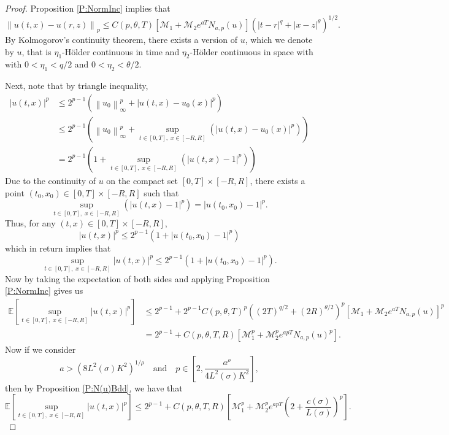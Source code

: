 \documentclass[a4paper,11pt]{article}
\numberwithin{equation}{section}
\theoremstyle{plain}
\theoremstyle{definition}
\newcommand{\Norm}[1]{\left\|  #1   \right\|}
\numberwithin{NQ}{section}
\numberwithin{LQ}{section}
\numberwithin{ZQ}{section}
\begin{document}
	\begin{proof}
		Proposition \ref{P:NormInc} implies that 
		\begin{equation}
		\Norm{u(t,x) - u(r,z)}_p \le C(p,\theta, T)\left[ \mathcal{M}_1 + \mathcal{M}_2e^{aT}N_{a,p}(u) \right]\left(|t-r|^{q} + |x-z|^{\theta}\right)^{1/2}.
		\end{equation}
		By Kolmogorov's continuity theorem, there exists a version of $u$, which we denote by $u$, that is $\eta_1$-H\"older continuous in time and $\eta_2$-H\"older continuous in space with with $0<\eta_1 < q/2$ and $0<\eta_2 < \theta/2$.
		
		Next, note that by triangle inequality,
		\begin{align*}
		|u(t,x)|^p &\le 2^{p-1}\left( \Norm{u_0}_{\infty}^p + |u(t,x)-u_0(x)|^p \right) \\
		&\le 2^{p-1}\left( \Norm{u_0}_{\infty}^p + \sup_{t\in[0,T],\; x\in[-R,R]}\left(|u(t,x)-u_0(x)|^p\right) \right) \\
		&= 2^{p-1}\left( 1 + \sup_{t\in[0,T],\; x\in[-R,R]}\left(|u(t,x)-1|^p\right) \right)
		\end{align*}
		Due to the continuity of $u$ on the compact set $[0,T] \times [-R,R]$, there exists a point $(t_0,x_0) \in [0,T] \times [-R,R]$ such that 
		\[
		\sup_{t\in[0,T],\; x\in[-R,R]}\left(|u(t,x)-1|^p\right) = |u(t_0,x_0)-1|^p.
		\]
		Thus, for any $(t,x) \in [0,T] \times [-R,R]$,
		\[
		|u(t,x)|^p \le 2^{p-1}\left( 1  + |u(t_0,x_0)-1|^p \right)
		\] 
		which in return implies that 
		\[
		\sup_{t\in[0,T],\; x\in[-R,R]} |u(t,x)|^p \le 2^{p-1}\left(1 + |u(t_0,x_0)-1|^p \right).
		\]
		Now by taking the expectation of both sides and applying Proposition \ref{P:NormInc} gives us 
		\begin{align*}
		\mathbb{E}\left[ \sup_{t\in[0,T],\; x\in[-R,R]} |u(t,x)|^p \right] &\le  2^{p-1} + 2^{p-1}C(p, \theta, T)^p\left((2T)^{q/2} + (2R)^{\theta /2}\right)^p\left[ \mathcal{M}_1 + \mathcal{M}_2 e^{aT} N_{a,p}(u)\right]^p \\
		&= 2^{p-1} + C(p, \theta, T,R) \left[ \mathcal{M}_1^p + \mathcal{M}_2^p e^{apT} N_{a,p}(u)^p\right].
		\end{align*}
		Now if we consider
		\[
		a > \left( 8 L^2(\sigma)K^2\right)^{1/\rho} \quad \text{and} \quad 	p \in \left[ 2, \frac{a^{\rho}}{4L^2(\sigma)K^2} \right],
		\]
		then by Proposition \ref{P:N(u)Bdd}, we have that 
		\[
		\mathbb{E}\left[ \sup_{t\in[0,T],\; x\in[-R,R]} |u(t,x)|^p \right] \le 2^{p-1} + C(p, \theta, T,R) \left[ \mathcal{M}_1^p + \mathcal{M}_2^p e^{apT} \left(2 +  \frac{c(\sigma)}{L(\sigma)}\right)^p\right].
		\]
	\end{proof}
	
\end{document}
